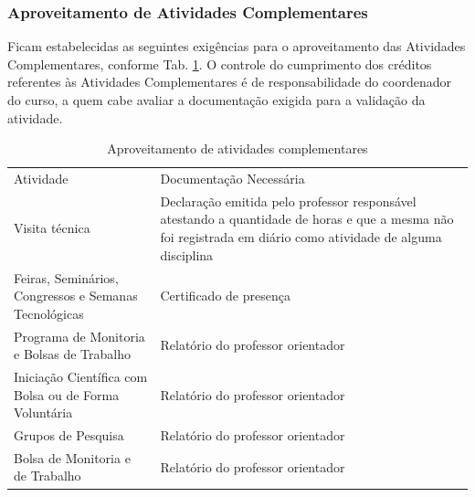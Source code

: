 \subsubsection{Aproveitamento de Atividades Complementares}

Ficam estabelecidas as seguintes exigências para o aproveitamento das Atividades Complementares, conforme Tab. \ref{tab13}. O controle do cumprimento dos créditos referentes às Atividades Complementares é de responsabilidade do coordenador do curso, a quem cabe avaliar a documentação exigida para a validação da atividade.

\begin{longtable}{|p{8.5cm}|p{5.5cm}|}
	
	\caption{Aproveitamento de atividades complementares}\label{tab13}
	
	\vspace{-0.25cm}
	
	
	\\ \hline 
	
	\cellcolor{\cinza}Atividade & \cellcolor{\cinza}Documentação Necessária \\ 
	
	\hline
	
	Visita técnica & Declaração emitida pelo professor responsável atestando a quantidade de horas e que a mesma não foi registrada em diário como atividade de alguma disciplina \\ 
	
	\hline 
	
	Feiras, Seminários, Congressos e Semanas Tecnológicas & Certificado de presença \\
	
	\hline
	
	Programa de Monitoria e Bolsas de Trabalho & Relatório do professor orientador \\
	
	\hline
	
	Iniciação Científica com Bolsa ou de Forma Voluntária & Relatório do professor orientador \\
	
	\hline
	
	Grupos de Pesquisa & Relatório do professor orientador \\
	
	\hline
	
	Bolsa de Monitoria e de Trabalho & Relatório do professor orientador \\
	

\end{longtable}
